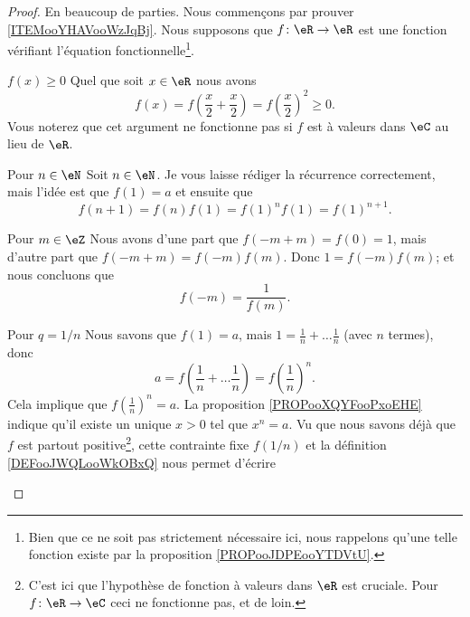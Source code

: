 \begin{proof}
    En beaucoup de parties. Nous commençons par prouver \ref{ITEMooYHAVooWzJqBj}. Nous supposons que \( f\colon \eR\to \eR\) est une fonction vérifiant l'équation fonctionnelle\footnote{Bien que ce ne soit pas strictement nécessaire ici, nous rappelons qu'une telle fonction existe par la proposition \ref{PROPooJDPEooYTDVtU}.}.
    \begin{subproof}
        \item[\( f(x)\geq 0\)]
            Quel que soit \( x\in \eR\) nous avons
            \begin{equation}
                f(x)=f(\frac{ x }{2}+\frac{ x }{2})=f(\frac{ x }{2})^2\geq 0.
            \end{equation}
            Vous noterez que cet argument ne fonctionne pas si \( f\) est à valeurs dans \( \eC\) au lieu de \( \eR\).
        \item[Pour \( n\in \eN\)]
            Soit \( n\in \eN\). Je vous laisse rédiger la récurrence correctement, mais l'idée est que \( f(1)=a\) et ensuite que
            \begin{equation}
                f(n+1)=f(n)f(1)=f(1)^nf(1)=f(1)^{n+1}.
            \end{equation}
        \item[Pour \( m\in \eZ\)]
            Nous avons d'une part que \( f(-m+m)=f(0)=1\), mais d'autre part que \( f(-m+m)=f(-m)f(m)\). Donc \( 1=f(-m)f(m)\); et nous concluons que
            \begin{equation}
                f(-m)=\frac{1}{ f(m) }.
            \end{equation}
        \item[Pour \( q=1/n\)]
            Nous savons que \( f(1)=a\), mais \( 1=\frac{1}{ n }+\ldots\frac{1}{ n }\) (avec \( n\) termes), donc
            \begin{equation}
                a=f(\frac{1}{ n }+\ldots \frac{1}{ n })=f(\frac{1}{ n })^n.
            \end{equation}
            Cela implique que \( f(\frac{1}{ n })^n=a\). La proposition \ref{PROPooXQYFooPxoEHE} indique qu'il existe un unique \( x>0\) tel que \( x^n=a\). Vu que nous savons déjà que \( f\) est partout positive\footnote{C'est ici que l'hypothèse de fonction à valeurs dans \( \eR\) est cruciale. Pour \( f\colon \eR\to \eC\) ceci ne fonctionne pas, et de loin.}, cette contrainte fixe \( f(1/n)\) et la définition \ref{DEFooJWQLooWkOBxQ} nous permet d'écrire
            \begin{equation}

\end{equation}
\end{subproof}
\end{proof}
